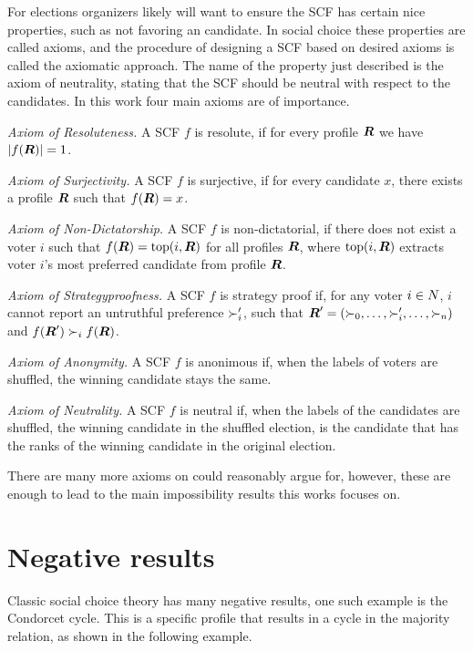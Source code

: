 For elections organizers likely will want to ensure the SCF has certain
nice properties, such as not favoring an candidate. In social choice these
properties are called axioms, and the procedure of designing a SCF based on
desired axioms is called the axiomatic approach. The name of the property just
described is the axiom of neutrality, stating that the SCF should be
neutral with respect to the candidates. In this work four main axioms are of
importance.

\emph{Axiom of Resoluteness.} A SCF $f$ is resolute, if for every profile
$\boldsymbol{R}$ we have $|f(\boldsymbol{R})| = 1$.

\emph{Axiom of Surjectivity.} A SCF $f$ is surjective, if for every candidate
$x$, there exists a profile $\boldsymbol{R}$ such that
$f(\boldsymbol{R}) = x$.

\emph{Axiom of Non-Dictatorship.} A SCF $f$ is non-dictatorial, if there does not exist a voter $i$ such that $f(\boldsymbol{R}) = \textnormal{top}(i,\boldsymbol{R})$ for all profiles $\boldsymbol{R}$, where $\textnormal{top}(i,\boldsymbol{R})$  extracts voter $i$'s most preferred candidate from profile $\boldsymbol{R}$.

\emph{Axiom of Strategyproofness.} A SCF $f$ is strategy proof if, for any
voter $i \in N$, $i$ cannot report an untruthful preference
$\succ_i'$, such that  $\boldsymbol{R}' = (\succ_{0}, \dots,
	\succ_{i}', \dots, \succ_{n})$ and $f(\boldsymbol{R}') \succ_i
	f(\boldsymbol{R})$.

\emph{Axiom of Anonymity.} A SCF $f$ is anonimous if, when the labels of voters
are shuffled, the winning candidate stays the same.

\emph{Axiom of Neutrality.} A SCF $f$ is neutral if, when the labels of the
candidates are shuffled, the winning candidate in the shuffled election, is
the candidate that has the ranks of the winning candidate in the original
election.

There are many more axioms on could reasonably argue for, however, these are
enough to lead to the main impossibility results this works focuses on.

\section{Negative results}
\label{preliminaries: negative results}

Classic social choice theory has many negative results, one such example is the
Condorcet cycle. This is a specific profile that results in a cycle in the
majority relation, as shown in the following example.

